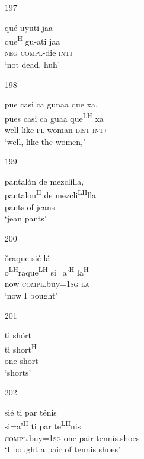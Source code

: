 \begin{itemize}
\item[197]
 
\glll   qu\'{e} uyuti jaa\\
 que\textsuperscript{H} gu-ati jaa\\
\textsc{neg} \textsc{compl}-die \textsc{intj}\\
\glt `not dead, huh'
 


\item[198]
 
\glll   pue casi ca gunaa que xa, \\
 pues casi ca guaa que\textsuperscript{LH} xa\\
well like \textsc{pl}  woman \textsc{dist} \textsc{intj} \\
\glt `well, like the women,'
 


\item[199]
 
\glll   pantal\'{o}n de mezcl\v{i}lla,\\
pantalon\textsuperscript{H} de mezcli\textsuperscript{LH}lla\\
 pants of jeans\\
\glt `jean pants'
 


\item[200]
 
\glll   \v{o}raque si\'{e} l\'{a}\\
o\textsuperscript{LH}raque\textsuperscript{LH} si=a'\textsuperscript{H} la\textsuperscript{H}\\
 now \textsc{compl}.buy=\textsc{1sg} \textsc{la}\\
\glt `now I bought'
 


\item[201]
 
\glll   ti sh\'{o}rt\\
ti short\textsuperscript{H}\\
one short \\
\glt `shorts'
 


\item[202]
 
\glll   si\'{e} ti par t\v{e}nis\\
si=a'\textsuperscript{H} ti par te\textsuperscript{LH}nis\\ 
 \textsc{compl}.buy=\textsc{1sg} one pair tennis.shoes\\
\glt `I bought a pair of tennis shoes'
 



\end{itemize}

